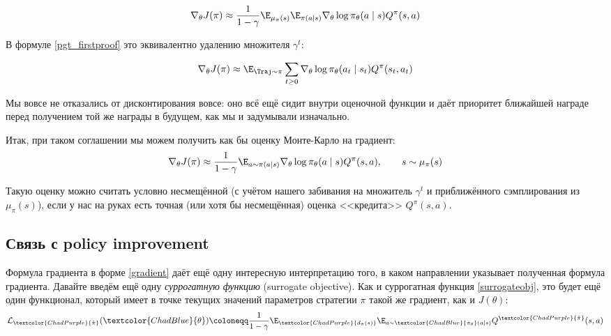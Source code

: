 \begin{equation*}
\nabla_{\theta} J(\pi) \approx \frac{1}{1 - \gamma}\E_{\mu_\pi(s)} \E_{\pi(a \mid s)} \nabla_{\theta} \log \pi_\theta (a \mid s) Q^{\pi}(s, a)
\end{equation*}

В формуле \eqref{pgt_firstproof} это эквивалентно удалению множителя $\gamma^t$:

\begin{equation*}
\nabla_{\theta} J(\pi) \approx \E_{\Traj \sim \pi} \sum_{t \ge 0} \nabla_{\theta} \log \pi_\theta (a_t \mid s_t) Q^{\pi}(s_t, a_t)
\end{equation*}

Мы вовсе не отказались от дисконтирования вовсе: оно всё ещё сидит внутри оценочной функции и даёт приоритет ближайшей награде перед получением той же награды в будущем, как мы и задумывали изначально.

Итак, при таком соглашении мы можем получить как бы оценку Монте-Карло на градиент:
$$\nabla_{\theta} J(\pi) \approx \frac{1}{1 - \gamma}\E_{a \sim \pi(a \mid s)} \nabla_{\theta} \log \pi_\theta (a \mid s) Q^{\pi}(s, a), \qquad s \sim \mu_\pi(s)$$

Такую оценку можно считать условно несмещённой (с учётом нашего забивания на множитель $\gamma^t$ и приближённого сэмплирования из $\mu_{\pi}(s)$), если у нас на руках есть точная (или хотя бы несмещённая) оценка <<кредита>> $Q^\pi(s, a)$.

\subsection{Связь с policy improvement}\label{subsec:pg_is_pi}

Формула градиента в форме \eqref{gradient} даёт ещё одну интересную интерпретацию того, в каком направлении указывает полученная формула градиента. Давайте введём ещё одну \emph{суррогатную функцию} (surrogate objective). Как и суррогатная функция \eqref{surrogateobj}, это будет ещё один функционал, который имеет в точке текущих значений параметров стратегии $\pi$ такой же градиент, как и $J(\theta)$:
\begin{equation}\label{PGisPI}
\mathcal{L}_{\textcolor{ChadPurple}{\tilde{\pi}}}(\textcolor{ChadBlue}{\theta}) \coloneqq \frac{1}{1 - \gamma}\E_{\textcolor{ChadPurple}{d_{\tilde{\pi}}(s)}} \E_{a \sim \textcolor{ChadBlue}{\pi_{\theta}}(a \mid s)} Q^{\textcolor{ChadPurple}{\tilde{\pi}}}(s, a)
\end{equation}

